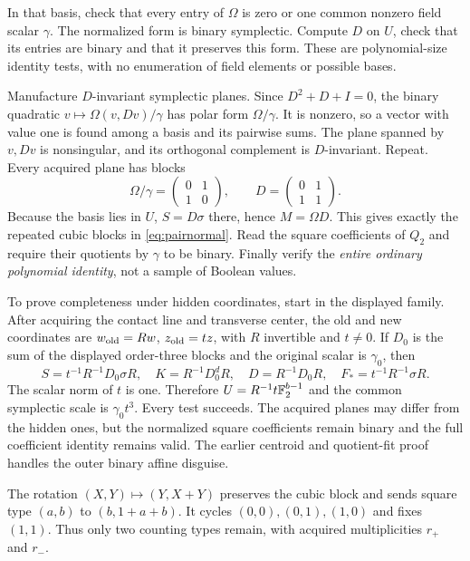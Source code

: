 In that basis, check that every entry of $\Omega$ is zero or one common
nonzero field scalar $\gamma$. The normalized form is binary symplectic.
Compute $D$ on $U$, check that its entries are binary and that it
preserves this form. These are polynomial-size identity tests, with no
enumeration of field elements or possible bases.

Manufacture $D$-invariant symplectic planes. Since $D^2+D+I=0$, the
binary quadratic $v\mapsto\Omega(v,Dv)/\gamma$ has polar form
$\Omega/\gamma$. It is nonzero, so a vector with value one is found
among a basis and its pairwise sums. The plane spanned by $v,Dv$ is
nonsingular, and its orthogonal complement is $D$-invariant. Repeat.
Every acquired plane has blocks
\[
 \Omega/\gamma=\begin{pmatrix}0&1\\1&0\end{pmatrix},\qquad
 D=\begin{pmatrix}0&1\\1&1\end{pmatrix}.
\]
Because the basis lies in $U$, $S=D\sigma$ there, hence $M=\Omega D$.
This gives exactly the repeated cubic blocks in \eqref{eq:pairnormal}.
Read the square coefficients of $Q_2$ and require their quotients by
$\gamma$ to be binary. Finally verify the \emph{entire ordinary
polynomial identity}, not a sample of Boolean values.

To prove completeness under hidden coordinates, start in the displayed
family. After acquiring the contact line and transverse center, the old
and new coordinates are $w_{\rm old}=Rw$, $z_{\rm old}=tz$, with $R$
invertible and $t\ne0$. If $D_0$ is the sum of the displayed order-three
blocks and the original scalar is $\gamma_0$, then
\[
 S=t^{-1}R^{-1}D_0\sigma R,\quad
 K=R^{-1}D_0^dR,\quad D=R^{-1}D_0R,\quad
 F_*=t^{-1}R^{-1}\sigma R.
\]
The scalar norm of $t$ is one. Therefore
$U=R^{-1}t\mathbb F_2^{b-1}$ and the common symplectic scale is
$\gamma_0t^3$. Every test succeeds. The acquired planes may differ
from the hidden ones, but the normalized square coefficients remain
binary and the full coefficient identity remains valid. The earlier
centroid and quotient-fit proof handles the outer binary affine disguise.

The rotation $(X,Y)\mapsto(Y,X+Y)$ preserves the cubic block and sends
square type $(a,b)$ to $(b,1+a+b)$. It cycles $(0,0),(0,1),(1,0)$ and
fixes $(1,1)$. Thus only two counting types remain, with acquired
multiplicities $r_+$ and $r_-$.

